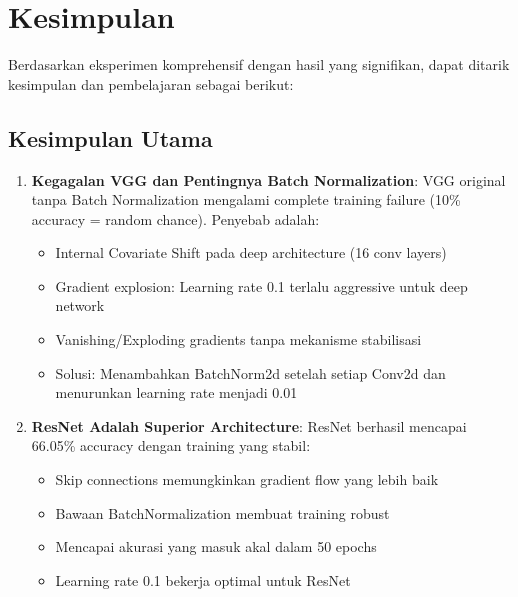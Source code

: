 \documentclass[12pt,a4paper]{report}
\begin{document}
\chapter{Kesimpulan}

Berdasarkan eksperimen komprehensif dengan hasil yang signifikan, dapat ditarik kesimpulan dan pembelajaran sebagai berikut:

\section{Kesimpulan Utama}

\begin{enumerate}
    \item \textbf{Kegagalan VGG dan Pentingnya Batch Normalization}: VGG original tanpa Batch Normalization mengalami complete training failure (10\% accuracy = random chance). Penyebab adalah:
    \begin{itemize}
        \item Internal Covariate Shift pada deep architecture (16 conv layers)
        \item Gradient explosion: Learning rate 0.1 terlalu aggressive untuk deep network
        \item Vanishing/Exploding gradients tanpa mekanisme stabilisasi
        \item Solusi: Menambahkan BatchNorm2d setelah setiap Conv2d dan menurunkan learning rate menjadi 0.01
    \end{itemize}
    
    \item \textbf{ResNet Adalah Superior Architecture}: ResNet berhasil mencapai 66.05\% accuracy dengan training yang stabil:
    \begin{itemize}
        \item Skip connections memungkinkan gradient flow yang lebih baik
        \item Bawaan BatchNormalization membuat training robust
        \item Mencapai akurasi yang masuk akal dalam 50 epochs
        \item Learning rate 0.1 bekerja optimal untuk ResNet
    \end{itemize}
    

\end{enumerate}
\end{document}
